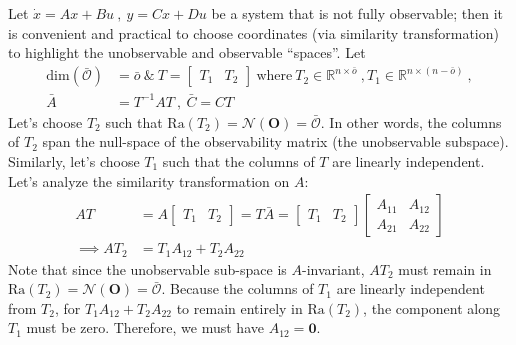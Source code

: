 \documentclass[twoside]{article}
\begin{document}
Let $\dot{x} = A x + B u \ , \ y = C x + D u$ be a system that is not fully observable; then it is convenient and practical to choose coordinates (via similarity transformation) to highlight the unobservable and observable ``spaces''. Let 
%
\begin{align*}
   \mathrm{dim}(\bar{\mathcal{O}}) &= \bar{o} 
   \ \& \
   T = \left[ \begin{array}{c|c} T_1 & T_2  \end{array} \right] \ \mathrm{where} \ T_2 \in \mathbb{R}^{n \times \bar{o}} \ , 
   T_1 \in \mathbb{R}^{n \times (n-\bar{o})} \ , 
   \\
   \bar{A} &= T^{-1} A T \ , \ \bar{C} = C T
\end{align*}
%
Let's choose $T_2$ such that $\mathrm{Ra}(T_2) = \mathcal{N}(\mathbf{O}) = \bar{\mathcal{O}}$. In other words, the columns of $T_2$
span the null-space of the observability matrix (the unobservable subspace).
Similarly, let's choose $T_1$ such that the columns of $T$ are linearly independent. Let's analyze the similarity transformation on $A$:
%
\begin{align*}
    A T &=  A \left[ \begin{array}{c|c} T_1 & T_2 \end{array} \right] = T \bar{A} = \left[ \begin{array}{c|c} T_1 & T_2 \end{array} \right]
    \left[ \begin{array}{c|c} A_{11} & A_{12} \\ \hline A_{21} & A_{22}  \end{array} \right]
    \\
    \implies A T_2 &= T_1 A_{12} + T_2 A_{22}
\end{align*}
%
Note that since the unobservable sub-space is $A$-invariant, $A T_2$ must remain in $\mathrm{Ra}(T_2) = \mathcal{N}(\mathbf{O}) = \bar{\mathcal{O}}$. 
Because the columns of $T_1$ are linearly independent from $T_2$, for $T_1 A_{12} + T_2 A_{22}$ to remain entirely in $\mathrm{Ra}(T_2)$, the component along $T_1$ must be zero. Therefore, we must have $A_{12} = \mathbf{0}$.
\end{document}

